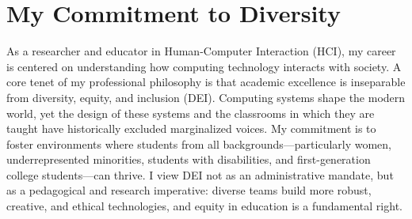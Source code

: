 \section{My Commitment to Diversity}

As a researcher and educator in Human-Computer Interaction (HCI), my career is centered on understanding how computing technology interacts with society. A core tenet of my professional philosophy is that academic excellence is inseparable from diversity, equity, and inclusion (DEI). Computing systems shape the modern world, yet the design of these systems and the classrooms in which they are taught have historically excluded marginalized voices. My commitment is to foster environments where students from all backgrounds---particularly women, underrepresented minorities, students with disabilities, and first-generation college students---can thrive. I view DEI not as an administrative mandate, but as a pedagogical and research imperative: diverse teams build more robust, creative, and ethical technologies, and equity in education is a fundamental right.
